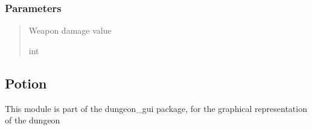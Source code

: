 \documentclass[letterpaper,10pt,english]{sphinxmanual}
\begin{document}
\begin{fulllineitems}
\begin{fulllineitems}
\subsubsection{Parameters}
\label{\detokenize{api_reference/dungeon_gui/Player:id5}}\begin{quote}\begin{description}
\sphinxAtStartPar
Weapon damage value

\sphinxAtStartPar
int

\end{description}\end{quote}

\end{fulllineitems}


\end{fulllineitems}


\sphinxstepscope


\subsection{Potion}
\label{\detokenize{api_reference/dungeon_gui/Potion:module-Potion}}\label{\detokenize{api_reference/dungeon_gui/Potion:potion}}\label{\detokenize{api_reference/dungeon_gui/Potion::doc}}
\sphinxAtStartPar
This module is part of the dungeon\_gui package, for the graphical representation of the dungeon
\end{document}
